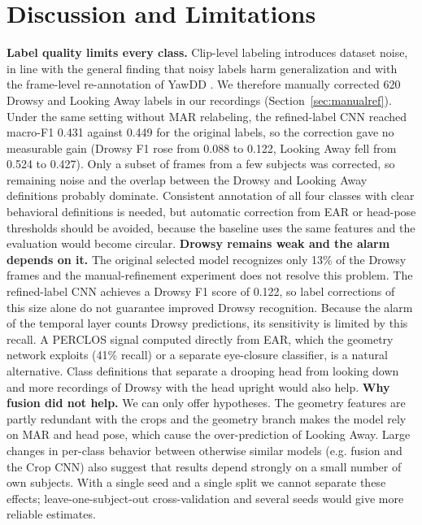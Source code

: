 \documentclass[conference]{IEEEtran}
\begin{document}
\vspace{0.2cm}
\section{Discussion and Limitations}

\textbf{Label quality limits every class.} Clip-level labeling introduces dataset noise, in line with the general finding that noisy labels harm generalization \cite{song2023} and with the frame-level re-annotation of YawDD \cite{mujtaba2025}. We therefore manually corrected 620 Drowsy and Looking Away labels in our recordings (Section~\ref{sec:manualref}). Under the same setting without MAR relabeling, the refined-label CNN reached macro-F1 0.431 against 0.449 for the original labels, so the correction gave no measurable gain (Drowsy F1 rose from 0.088 to 0.122, Looking Away fell from 0.524 to 0.427). Only a subset of frames from a few subjects was corrected, so remaining noise and the overlap between the Drowsy and Looking Away definitions probably dominate. Consistent annotation of all four classes with clear behavioral definitions is needed, but automatic correction from EAR or head-pose thresholds should be avoided, because the baseline uses the same features and the evaluation would become circular.
\newline
\textbf{Drowsy remains weak and the alarm depends on it.} The original selected model recognizes only 13\% of the Drowsy frames and the manual-refinement experiment does not resolve this problem. The refined-label CNN achieves a Drowsy F1 score of 0.122, so label corrections of this size alone do not guarantee improved Drowsy recognition. Because the alarm of the temporal layer counts Drowsy predictions, its sensitivity is limited by this recall. A PERCLOS signal computed directly from EAR, which the geometry network exploits (41\% recall) or a separate eye-closure classifier, is a natural alternative. Class definitions that separate a drooping head from looking down and more recordings of Drowsy with the head upright would also help.
\newline
\textbf{Why fusion did not help.} We can only offer hypotheses. The geometry features are partly redundant with the crops and the geometry branch makes the model rely on MAR and head pose, which cause the over-prediction of Looking Away. Large changes in per-class behavior between otherwise similar models (e.g. fusion and the Crop CNN) also suggest that results depend strongly on a small number of own subjects. With a single seed and a single split we cannot separate these effects; leave-one-subject-out cross-validation and several seeds would give more reliable estimates.
\end{document}
